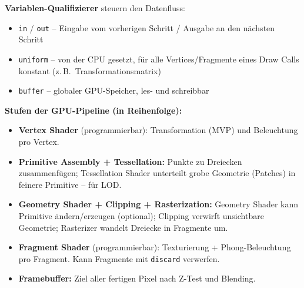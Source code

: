 \documentclass[12pt, a4paper]{article}
\begin{document}
\textbf{Variablen-Qualifizierer} steuern den Datenfluss:
\begin{itemize}
  \item \texttt{in} / \texttt{out} -- Eingabe vom vorherigen Schritt / Ausgabe an den nächsten Schritt
  \item \texttt{uniform} -- von der CPU gesetzt, für alle Vertices/Fragmente eines Draw Calls konstant (z.\,B.\ Transformationsmatrix)
  \item \texttt{buffer} -- globaler GPU-Speicher, les- und schreibbar
\end{itemize}

\textbf{Stufen der GPU-Pipeline (in Reihenfolge):}

\begin{center}
\end{center}

\begin{itemize}
  \item \textbf{Vertex Shader} (programmierbar): Transformation (MVP) und Beleuchtung pro Vertex.
  \item \textbf{Primitive Assembly + Tessellation:} Punkte zu Dreiecken zusammenfügen; Tessellation Shader unterteilt grobe Geometrie (Patches) in feinere Primitive -- für LOD.
  \item \textbf{Geometry Shader + Clipping + Rasterization:} Geometry Shader kann Primitive ändern/erzeugen (optional); Clipping verwirft unsichtbare Geometrie; Rasterizer wandelt Dreiecke in Fragmente um.
  \item \textbf{Fragment Shader} (programmierbar): Texturierung + Phong-Beleuchtung pro Fragment. Kann Fragmente mit \texttt{discard} verwerfen.
  \item \textbf{Framebuffer:} Ziel aller fertigen Pixel nach Z-Test und Blending.
\end{itemize}
\end{document}
